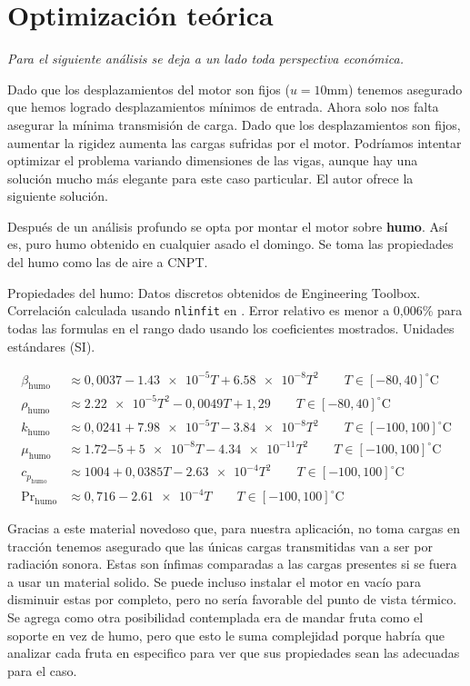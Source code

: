 \documentclass[onecolumn,10pt,titlepage,a4paper]{article}
\newcommand{\celsius}{^\circ \mathrm{C}}
\newcommand{\air}{{\mathrm{humo}}}
\begin{document}
\section{Optimización teórica}
\textit{Para el siguiente análisis se deja a un lado toda perspectiva económica.}

Dado que los desplazamientos del motor son fijos ($u=10\si{\milli\meter}$) tenemos asegurado que hemos logrado desplazamientos mínimos de entrada. Ahora solo nos falta asegurar la mínima transmisión de carga. Dado que los desplazamientos son fijos, aumentar la rigidez aumenta las cargas sufridas por el motor. Podríamos intentar optimizar el problema variando dimensiones de las vigas, aunque hay una solución mucho más elegante para este caso particular. El autor ofrece la siguiente solución.


Después de un análisis profundo se opta por montar el motor sobre \textbf{humo}. Así es, puro humo obtenido en cualquier asado el domingo. Se toma las propiedades del humo como las de aire a CNPT.

Propiedades del humo: Datos discretos obtenidos de Engineering Toolbox. Correlación calculada usando \verb|nlinfit| en \Matlab. Error relativo es menor a 0,006\% para todas las formulas en el rango dado usando los coeficientes mostrados. Unidades estándares (SI).

\begin{align*}
\beta_\air &\approx 0,0037-\num{1,43e-5}T+\num{6,58e-8}T^2 \qquad T\in [-80,40]\celsius \\
\rho_\air &\approx  \num{2,22e-5}T^2-0,0049T+1,29\qquad T\in [-80,40]\celsius \\
k_\air &\approx 0,0241 + \num{7.98e-5}T-\num{3,84e-8}T^2 \qquad T\in [-100,100]\celsius \\
\mu_\air &\approx \num{1,72}{-5} +\num{5e-8}T-\num{4,34e-11}T^2\qquad T\in [-100,100]\celsius \\
c_{p_\air} &\approx 1004 + 0,0385T-\num{2,63e-4}T^2 \qquad T\in [-100,100]\celsius \\
\mathrm{Pr}_\air &\approx 0,716 -\num{2,61e-4}T  \qquad T\in [-100,100]\celsius
\end{align*}

Gracias a este material novedoso que, para nuestra aplicación, no toma cargas en tracción tenemos asegurado que las únicas cargas transmitidas van a ser por radiación sonora. Estas son ínfimas comparadas a las cargas presentes si se fuera a usar un material solido. Se puede incluso instalar el motor en vacío para disminuir estas por completo, pero no sería favorable del punto de vista térmico. Se agrega como otra posibilidad contemplada era de mandar fruta como el soporte en vez de humo, pero que esto le suma complejidad porque habría que analizar cada fruta en especifico para ver que sus propiedades sean las adecuadas para el caso.
\end{document}
